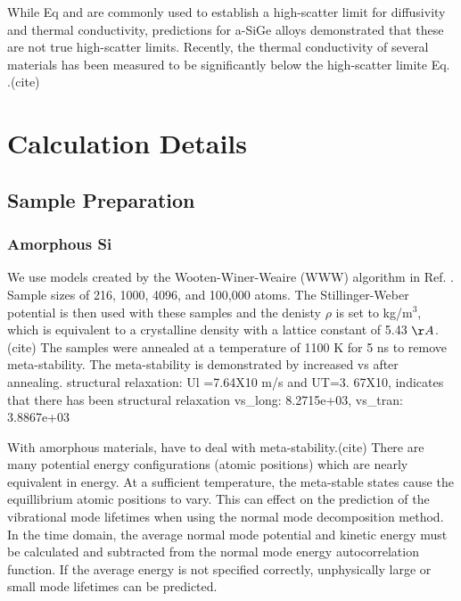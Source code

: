 \documentclass[aps,prb,twocolumn,superscriptaddress,footinbib,amsmath,amssymb,floatfix]{revtex4}
\begin{document}
While Eq and are commonly used to establish a high-scatter limit for 
diffusivity and thermal conductivity, predictions for a-SiGe alloys 
demonstrated that these are not true high-scatter limits.
\cite{feldman_thermal_1993} Recently, the thermal conductivity 
of several materials has been measured to be significantly below the 
high-scatter limite Eq. .(cite) 



\section{\label{S:Calculation}Calculation Details}

\subsection{\label{S:Sample}Sample Preparation}

\subsubsection{\label{S:Sample:Si}Amorphous Si}

We use models created by the Wooten-Winer-Weaire (WWW) algorithm in  
Ref. .  Sample sizes of 
216, 1000, 4096, and 100,000 atoms. The Stillinger-Weber potential is 
then used with these samples and the denisty $\rho$ is set to 
kg/m$^3$, which 
is equivalent to a crystalline density with a lattice constant of 
5.43 $\AA$.(cite)  
The samples were annealed at a temperature of 1100 K for 5 ns to remove 
meta-stability. The meta-stability is demonstrated by increased vs after 
annealing. structural relaxation:  Ul =7.64X10 m/s and UT=3. 67X10, 
indicates that 
there has been structural relaxation 
vs_long: 8.2715e+03, vs_tran: 3.8867e+03

With amorphous materials, 
have to deal with meta-stability.(cite) There are many potential energy 
configurations 
(atomic positions) which are nearly equivalent in energy.  At a sufficient 
temperature, the meta-stable states cause the equillibrium atomic positions 
to vary.  This can effect on the prediction of the vibrational mode 
lifetimes when using the normal 
mode decomposition method. In the time domain, the average normal 
mode potential and kinetic energy must be calculated and subtracted 
from the normal mode energy autocorrelation function.  If the average 
energy is not specified correctly, unphysically large or small mode 
lifetimes can be predicted.
\end{document}
